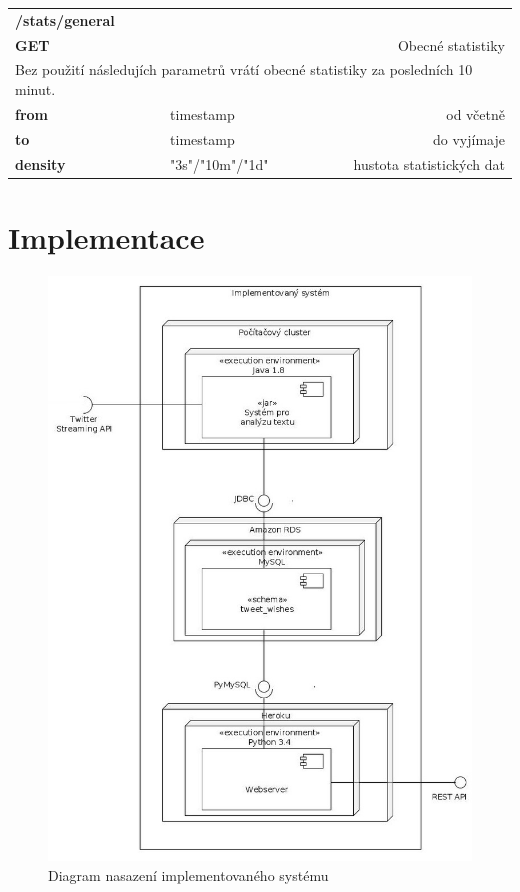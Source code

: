 \documentclass[thesis=B,czech]{FITthesis}[2012/06/26]
\begin{document}
\begin{table}[h]
\begin{tabular}{llllr}
\rowcolor[HTML]{EFEFEF}
\large \textbf{/stats/general}        &         &                 &        & \multicolumn{1}{l}{}                \\
\rowcolor[HTML]{EFEFEF}
\textbf{GET}          &         &                 &        & Obecné statistiky                        \\
\multicolumn{5}{l}{\parbox[t]{12.8cm}{Bez použití následujích parametrů vrátí obecné statistiky za posledních 10 minut.  }  } \\
\textbf{from}         &         & timestamp       &        & od včetně                           \\
\textbf{to}           &         & timestamp       &        & do vyjímaje                         \\
\textbf{density}        &         & "3s"/"10m"/"1d"         &        & hustota statistických dat   \\
\end{tabular}
\end{table}


\chapter{Implementace}
\begin{figure}[ht]
   	\centering
   	\includegraphics[width=1\textwidth]{images/deployment.jpg}
   	\caption{Diagram nasazení implementovaného systému}
   	\label{fig:deployment_diagram}
\end{figure}
\end{document}
